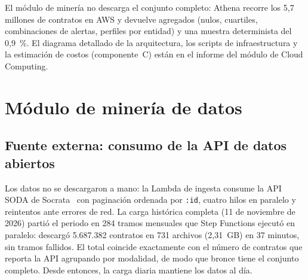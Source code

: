 \documentclass[conference,a4paper]{IEEEtran}
\newcommand{\code}[1]{\texttt{#1}}
\begin{document}
El módulo de minería no descarga el conjunto completo: Athena recorre los 5,7 millones de contratos en AWS y
devuelve agregados (nulos, cuartiles, combinaciones de alertas, perfiles por entidad) y una muestra determinista
del 0,9~\%. El diagrama detallado de la arquitectura, los scripts de infraestructura y la estimación de costos
(componente~C) están en el informe del módulo de Cloud Computing.

\section{Módulo de minería de datos}
\subsection{Fuente externa: consumo de la API de datos abiertos}
\label{sec:fuente}
Los datos no se descargaron a mano: la Lambda de ingesta consume la API SODA de Socrata~\cite{soda} con
paginación ordenada por \code{:id}, cuatro hilos en paralelo y reintentos ante errores de red. La carga
histórica completa (11 de noviembre de 2026) partió el periodo en 284 tramos mensuales que Step Functions
ejecutó en paralelo: descargó 5.687.382 contratos en 731 archivos (2,31~GB) en 37 minutos, sin tramos fallidos.
El total coincide exactamente con el número de contratos que reporta la API agrupando por modalidad, de modo que
bronce tiene el conjunto completo. Desde entonces, la carga diaria mantiene los datos al día.
\end{document}
